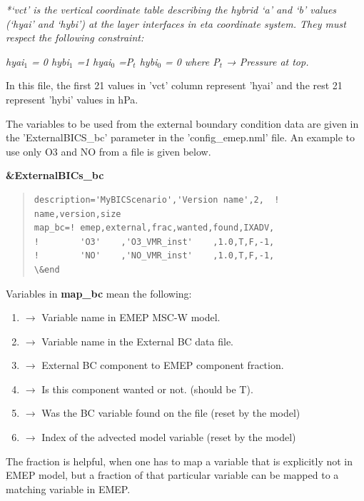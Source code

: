 \documentclass[a4paper,12pt]{report}
\begin{document}
\textit {*`vct' is the vertical coordinate table describing the hybrid `a' and `b' values (`hyai' and `hybi') at the layer interfaces in eta coordinate system.  They must respect the following constraint:} 

\textit{hyai$_{1}$ = 0    hybi${_1}$ =1}
\newline
\textit{hyai${_0}$ =P${_t}$   hybi${_0}$ = 0}
\newline
\textit{where P${_t}$ → Pressure at top.}
\newline

In this file, the first 21 values in 'vct' column represent 'hyai' and the rest 21 represent 'hybi' values in hPa.  

The variables to be used from the external boundary condition data are given in the 'ExternalBICS\_bc' parameter in the 'config\_emep.nml' file.  An example to use only O3 and NO from a file is given below. 

{\bf \&ExternalBICs\_bc}
\begin{quote}
\begin{verbatim}
description='MyBICScenario','Version name',2,  ! name,version,size 
map_bc=! emep,external,frac,wanted,found,IXADV, 
!        'O3'    ,'O3_VMR_inst'    ,1.0,T,F,-1,
!        'NO'    ,'NO_VMR_inst'    ,1.0,T,F,-1,
\&end 
\end{verbatim}
\end{quote}

Variables in {\bf map\_bc} mean the following: 

\begin{enumerate}
\item ${\rightarrow}$  Variable name in EMEP MSC-W model.
\item ${\rightarrow}$  Variable name in the External BC data file. 
\item ${\rightarrow}$  External BC component to EMEP component fraction.  
\item ${\rightarrow}$  Is this component wanted or not.  (should be T). 
\item ${\rightarrow}$  Was the BC variable found on the file (reset by the model)
\item ${\rightarrow}$  Index of the advected model variable (reset by the model)			 
\end{enumerate}

The fraction is helpful, when one has to map a variable that is explicitly not in EMEP 	model, but a fraction of that particular variable can be mapped to a matching variable in EMEP.
\end{document}
